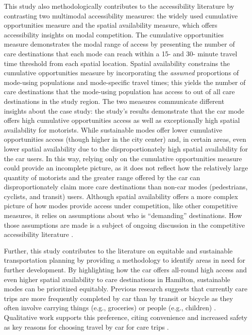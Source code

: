 \documentclass[
  authoryear,
  preprint,
  3p]{elsarticle}
\begin{document}
This study also methodologically contributes to the accessibility
literature by contrasting two multimodal accessibility measures: the
widely used cumulative opportunities measure and the spatial
availability measure, which offers accessibility insights on modal
competition. The cumulative opportunities measure demonstrates the modal
range of access by presenting the number of care destinations that each
mode can reach within a 15- and 30- minute travel time threshold from
each spatial location. Spatial availability constrains the cumulative
opportunities measure by incorporating the \emph{assumed} proportions of
mode-using populations and mode-specific travel times; this yields the
number of care destinations that the mode-using population has access to
out of all care destinations in the study region. The two measures
communicate different insights about the case study: the study's results
demonstrate that the car mode offers high cumulative opportunities
access as well as exceptionally high spatial availability for motorists.
While sustainable modes offer lower cumulative opportunities access
(though higher in the city center) and, in certain areas, even lower
spatial availability due to the disproportionately high spatial
availability for the car users. In this way, relying only on the
cumulative opportunities measure could provide an incomplete picture, as
it does not reflect how the relatively large quantity of motorists and
the greater range offered by the car can disproportionately claim more
care destinations than non-car modes (pedestrians, cyclists, and
transit) users. Although spatial availability offers a more complex
picture of how modes provide access under competition, like other
competitive measures, it relies on assumptions about who is
``demanding'' destinations. How those assumptions are made is a subject
of ongoing discussion in the competitive accessibility literature
\citep{merlinDoesCompetitionMatter2017, kelobonyeMeasuringAccessibilitySpatial2020}.

Further, this study contributes to the literature on equitable and
sustainable transportation planning by providing a methodology to
identify areas in need for further development. By highlighting how the
car offers all-round high access and even higher spatial availability to
care destinations in Hamilton, sustainable modes can be prioritized
equitably. Previous research suggests that currently care trips are more
frequently completed by car than by transit or bicycle as they often
involve carrying things (e.g., groceries) or people (e.g., children)
\citep{ravensbergenExploratoryAnalysisMobility2022}. Qualitative work
supports this preference, citing convenience and increased safety as key
reasons for choosing travel by car for care trips
\citep{maciejewskaHaveChildrenThus2019, carverParentalChauffeursWhat2013}.
\end{document}
